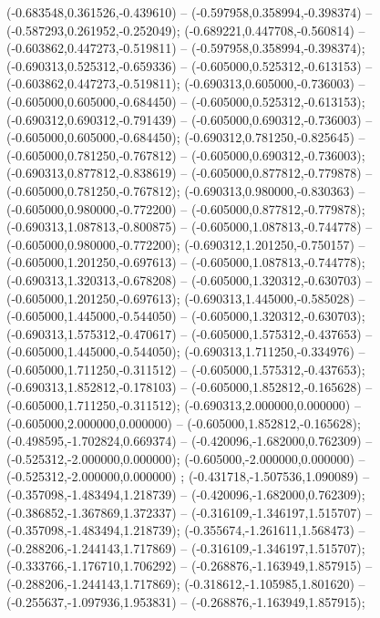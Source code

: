  (-0.683548,0.361526,-0.439610) -- (-0.597958,0.358994,-0.398374) -- (-0.587293,0.261952,-0.252049);
 (-0.689221,0.447708,-0.560814) -- (-0.603862,0.447273,-0.519811) -- (-0.597958,0.358994,-0.398374);
 (-0.690313,0.525312,-0.659336) -- (-0.605000,0.525312,-0.613153) -- (-0.603862,0.447273,-0.519811);
 (-0.690313,0.605000,-0.736003) -- (-0.605000,0.605000,-0.684450) -- (-0.605000,0.525312,-0.613153);
 (-0.690312,0.690312,-0.791439) -- (-0.605000,0.690312,-0.736003) -- (-0.605000,0.605000,-0.684450);
 (-0.690312,0.781250,-0.825645) -- (-0.605000,0.781250,-0.767812) -- (-0.605000,0.690312,-0.736003);
 (-0.690313,0.877812,-0.838619) -- (-0.605000,0.877812,-0.779878) -- (-0.605000,0.781250,-0.767812);
 (-0.690313,0.980000,-0.830363) -- (-0.605000,0.980000,-0.772200) -- (-0.605000,0.877812,-0.779878);
 (-0.690313,1.087813,-0.800875) -- (-0.605000,1.087813,-0.744778) -- (-0.605000,0.980000,-0.772200);
 (-0.690312,1.201250,-0.750157) -- (-0.605000,1.201250,-0.697613) -- (-0.605000,1.087813,-0.744778);
 (-0.690313,1.320313,-0.678208) -- (-0.605000,1.320312,-0.630703) -- (-0.605000,1.201250,-0.697613);
 (-0.690313,1.445000,-0.585028) -- (-0.605000,1.445000,-0.544050) -- (-0.605000,1.320312,-0.630703);
 (-0.690313,1.575312,-0.470617) -- (-0.605000,1.575312,-0.437653) -- (-0.605000,1.445000,-0.544050);
 (-0.690313,1.711250,-0.334976) -- (-0.605000,1.711250,-0.311512) -- (-0.605000,1.575312,-0.437653);
 (-0.690313,1.852812,-0.178103) -- (-0.605000,1.852812,-0.165628) -- (-0.605000,1.711250,-0.311512);
 (-0.690313,2.000000,0.000000) -- (-0.605000,2.000000,0.000000) -- (-0.605000,1.852812,-0.165628);
 (-0.498595,-1.702824,0.669374) -- (-0.420096,-1.682000,0.762309) -- (-0.525312,-2.000000,0.000000);
 (-0.605000,-2.000000,0.000000) -- (-0.525312,-2.000000,0.000000) ;
 (-0.431718,-1.507536,1.090089) -- (-0.357098,-1.483494,1.218739) -- (-0.420096,-1.682000,0.762309);
 (-0.386852,-1.367869,1.372337) -- (-0.316109,-1.346197,1.515707) -- (-0.357098,-1.483494,1.218739);
 (-0.355674,-1.261611,1.568473) -- (-0.288206,-1.244143,1.717869) -- (-0.316109,-1.346197,1.515707);
 (-0.333766,-1.176710,1.706292) -- (-0.268876,-1.163949,1.857915) -- (-0.288206,-1.244143,1.717869);
 (-0.318612,-1.105985,1.801620) -- (-0.255637,-1.097936,1.953831) -- (-0.268876,-1.163949,1.857915);

